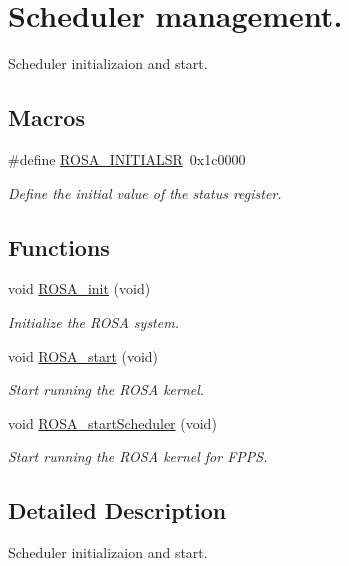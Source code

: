 \hypertarget{group__rosa__kernel__sm}{}\section{Scheduler management.}
\label{group__rosa__kernel__sm}


Scheduler initializaion and start.  


\subsection*{Macros}
\begin{DoxyCompactItemize}
\item 
\mbox{\label{group__rosa__kernel__sm_gaf4c28a200166f46384b123c7be151e77}} 
\#define \mbox{\hyperlink{group__rosa__kernel__sm_gaf4c28a200166f46384b123c7be151e77}{R\+O\+S\+A\+\_\+\+I\+N\+I\+T\+I\+A\+L\+SR}}~0x1c0000
\begin{DoxyCompactList}\small\item\em Define the initial value of the status register. \end{DoxyCompactList}\end{DoxyCompactItemize}
\subsection*{Functions}
\begin{DoxyCompactItemize}
\item 
\mbox{\label{group__rosa__kernel__sm_ga83eda3bb4fb3a94dea3894a596a662e6}} 
void \mbox{\hyperlink{group__rosa__kernel__sm_ga83eda3bb4fb3a94dea3894a596a662e6}{R\+O\+S\+A\+\_\+init}} (void)
\begin{DoxyCompactList}\small\item\em Initialize the R\+O\+SA system. \end{DoxyCompactList}\item 
\mbox{\label{group__rosa__kernel__sm_ga299c2721dc32b54f2acb881cf98bc13d}} 
void \mbox{\hyperlink{group__rosa__kernel__sm_ga299c2721dc32b54f2acb881cf98bc13d}{R\+O\+S\+A\+\_\+start}} (void)
\begin{DoxyCompactList}\small\item\em Start running the R\+O\+SA kernel. \end{DoxyCompactList}\item 
\mbox{\label{group__rosa__kernel__sm_gaa7bf5f9ee0c2f711b8adeec7c816f44a}} 
void \mbox{\hyperlink{group__rosa__kernel__sm_gaa7bf5f9ee0c2f711b8adeec7c816f44a}{R\+O\+S\+A\+\_\+start\+Scheduler}} (void)
\begin{DoxyCompactList}\small\item\em Start running the R\+O\+SA kernel for F\+P\+PS. \end{DoxyCompactList}\end{DoxyCompactItemize}


\subsection{Detailed Description}
Scheduler initializaion and start. 


